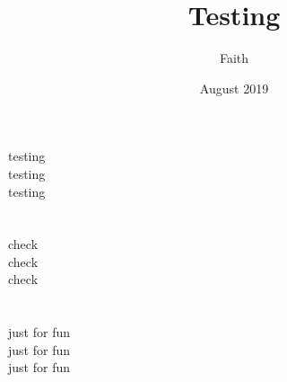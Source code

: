 \documentclass{article}
\title{Testing}
\date{August 2019}
\author{Faith}
\begin{document}
\maketitle
testing \\
testing\\
testing\\
\\
\\
check\\
check\\
check\\
\\
\\
just for fun
\\
just for fun
\\
just for fun
\\
\end{document}
